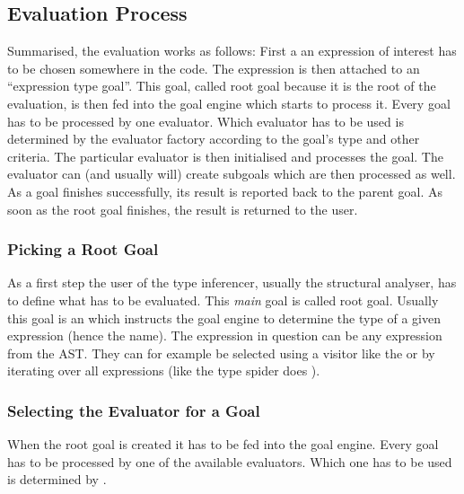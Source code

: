 \documentclass[12pt,halfparskip,DIV11,BCOR10mm]{scrreprt}
\begin{document}




\subsection{Evaluation Process}

Summarised, the evaluation works as follows: First a an expression of interest has to be chosen somewhere in the code. The expression is then attached to an ``expression type goal''. This goal, called root goal because it is the root of the evaluation, is then fed into the goal engine which starts to process it. Every goal has to be processed by one evaluator. Which evaluator has to be used is determined by the evaluator factory according to the goal's type and other criteria. The particular evaluator is then initialised and processes the goal. The evaluator can (and usually will) create subgoals which are then processed as well. As a goal finishes successfully, its result is reported back to the parent goal. As soon as the root goal finishes, the result is returned to the user.

\subsubsection{Picking a Root Goal}

As a first step the user of the type inferencer, usually the structural analyser, has to define what has to be evaluated. This \emph{main} goal is called root goal. Usually this goal is an  which instructs the goal engine to determine the type of a given expression (hence the name). The expression in question can be any expression from the AST. They can for example be selected using a visitor like the  or by iterating over all expressions (like the type spider does ).

\subsubsection{Selecting the Evaluator for a Goal}

When the root goal is created it has to be fed into the goal engine. Every goal has to be processed by one of the available evaluators. Which one has to be used is determined by .
\end{document}
